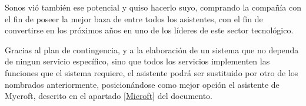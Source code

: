 \begin{enumerate}
        Sonos vió también ese potencial y quiso hacerlo suyo, comprando la compañía con el fin de poseer la mejor baza de entre todos los asistentes, con el fin de convertirse en los próximos años en uno de los líderes de este sector tecnológico.
        
        Gracias al plan de contingencia, y a la elaboración de un sistema que no dependa de ningun servicio específico, sino que todos los servicios implementen las funciones que el sistema requiere, el asistente podrá ser sustituido por otro de los nombrados anteriormente, posicionándose como mejor opción el asistente de Mycroft, descrito en el apartado \ref{Microft} del documento.
        
        
        \end{enumerate}